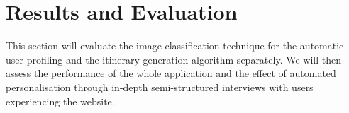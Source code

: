 
\section{Results and Evaluation}

This section will evaluate the image
classification technique for the automatic user profiling and the itinerary
generation algorithm separately. We will then assess the performance of the
whole application and the effect of automated personalisation through in-depth
semi-structured interviews with users experiencing the website.




